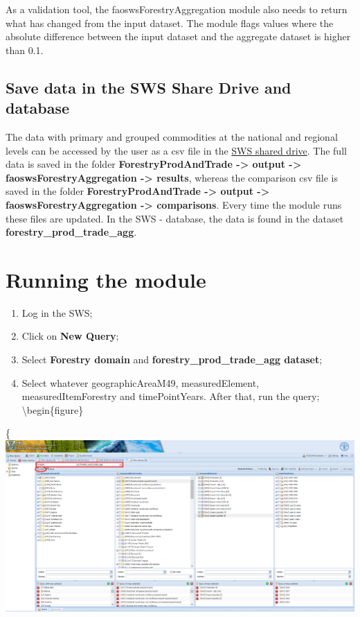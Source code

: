 \documentclass[
]{book}
\begin{document}
As a validation tool, the faoswsForestryAggregation module also needs to return what has changed from the input dataset. The module flags values where the absolute difference between the input dataset and the aggregate dataset is higher than 0.1.

\hypertarget{save-data-in-the-sws-share-drive-and-database}{%
\subsection{\texorpdfstring{\textbf{Save data in the SWS Share Drive and database}}{Save data in the SWS Share Drive and database}}\label{save-data-in-the-sws-share-drive-and-database}}

The data with primary and grouped commodities at the national and regional levels can be accessed by the user as a csv file in the \href{file://hqlprsws1.hq.un.fao.org/sws_r_share/ForestryProdAndTrade/output/faoswsForestryAggregation/}{SWS shared drive}. The full data is saved in the folder \textbf{ForestryProdAndTrade -\textgreater{} output -\textgreater{} faoswsForestryAggregation -\textgreater{} results}, whereas the comparison csv file is saved in the folder \textbf{ForestryProdAndTrade -\textgreater{} output -\textgreater{} faoswsForestryAggregation -\textgreater{} comparisons}. Every time the module runs these files are updated.
In the SWS - database, the data is found in the dataset \textbf{forestry\_prod\_trade\_agg}.

\hypertarget{running-the-module-3}{%
\section{\texorpdfstring{\textbf{Running the module}}{Running the module}}\label{running-the-module-3}}

\begin{enumerate}
\def\labelenumi{\arabic{enumi}.}
\item
  Log in the SWS;
\item
  Click on \textbf{New Query};
\item
  Select \textbf{Forestry domain} and \textbf{forestry\_prod\_trade\_agg dataset};
\item
  Select whatever geographicAreaM49, measuredElement, measuredItemForestry and timePointYears. After that, run the query;
  \textbackslash begin\{figure\}
\end{enumerate}

\{\centering \includegraphics[width=1\linewidth]{images/forestry_prod_trade_agg_query}
\end{document}

